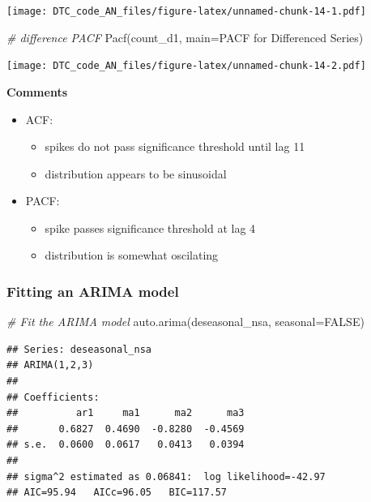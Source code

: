 \documentclass[
]{article}
\newenvironment{Shaded}{\begin{snugshade}}{\end{snugshade}}
\newcommand{\AttributeTok}[1]{\textcolor[rgb]{0.77,0.63,0.00}{#1}}
\newcommand{\CommentTok}[1]{\textcolor[rgb]{0.56,0.35,0.01}{\textit{#1}}}
\newcommand{\ConstantTok}[1]{\textcolor[rgb]{0.00,0.00,0.00}{#1}}
\newcommand{\FunctionTok}[1]{\textcolor[rgb]{0.00,0.00,0.00}{#1}}
\newcommand{\NormalTok}[1]{#1}
\newcommand{\StringTok}[1]{\textcolor[rgb]{0.31,0.60,0.02}{#1}}
\providecommand{\tightlist}{%
  \setlength{\itemsep}{0pt}\setlength{\parskip}{0pt}}
\begin{document}
\texttt{[image: DTC\_code\_AN\_files/figure-latex/unnamed-chunk-14-1.pdf]}

\begin{Shaded}
\begin{Highlighting}[]
\CommentTok{\# difference PACF}
\FunctionTok{Pacf}\NormalTok{(count\_d1, }\AttributeTok{main=}\StringTok{\textquotesingle{}PACF for Differenced Series\textquotesingle{}}\NormalTok{)}
\end{Highlighting}
\end{Shaded}

\texttt{[image: DTC\_code\_AN\_files/figure-latex/unnamed-chunk-14-2.pdf]}

\textbf{Comments}

\begin{itemize}
\item
  ACF:

  \begin{itemize}
  \tightlist
  \item
    spikes do not pass significance threshold until lag 11
  \item
    distribution appears to be sinusoidal
  \end{itemize}
\item
  PACF:

  \begin{itemize}
  \tightlist
  \item
    spike passes significance threshold at lag 4
  \item
    distribution is somewhat oscilating
  \end{itemize}
\end{itemize}

\hypertarget{fitting-an-arima-model}{%
\subsubsection{Fitting an ARIMA model}\label{fitting-an-arima-model}}

\begin{Shaded}
\begin{Highlighting}[]
\CommentTok{\# Fit the ARIMA model}
\FunctionTok{auto.arima}\NormalTok{(deseasonal\_nsa, }\AttributeTok{seasonal=}\ConstantTok{FALSE}\NormalTok{)}
\end{Highlighting}
\end{Shaded}

\begin{verbatim}
## Series: deseasonal_nsa 
## ARIMA(1,2,3) 
## 
## Coefficients:
##          ar1     ma1      ma2      ma3
##       0.6827  0.4690  -0.8280  -0.4569
## s.e.  0.0600  0.0617   0.0413   0.0394
## 
## sigma^2 estimated as 0.06841:  log likelihood=-42.97
## AIC=95.94   AICc=96.05   BIC=117.57
\end{verbatim}
\end{document}
